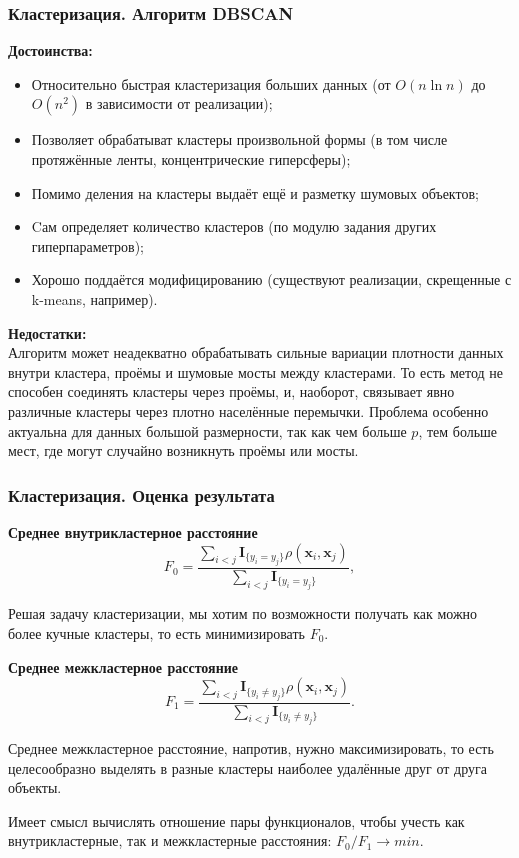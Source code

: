 \documentclass[notheorems, handout]{beamer}
\begin{document}
	\begin{frame}
	\frametitle{Кластеризация. Алгоритм DBSCAN}
	

	\textbf{Достоинства:} 
\begin{itemize}
	\item Относительно быстрая кластеризация больших данных (от $O(n \ln n)$ до $O(n^2)$ в зависимости от реализации); 
	\item Позволяет обрабатыват кластеры произвольной формы (в том числе протяжённые ленты, концентрические гиперсферы); 
	\item Помимо деления на кластеры выдаёт ещё и разметку шумовых объектов; 
	\item Cам определяет количество кластеров (по модулю задания других гиперпараметров);
	\item Хорошо поддаётся модифицированию (существуют реализации, скрещенные с k-means, например). 
\end{itemize}

\textbf{Недостатки:}\\ 
	Алгоритм может неадекватно обрабатывать сильные вариации плотности данных внутри кластера, проёмы и шумовые мосты между кластерами.
	То есть метод не способен соединять кластеры через проёмы, и, наоборот, связывает явно различные кластеры через плотно населённые перемычки. Проблема особенно актуальна для данных большой размерности, так как чем больше $p$, тем больше мест, где могут случайно возникнуть проёмы или мосты.

	\end{frame}
	
	\begin{frame}
	\frametitle{Кластеризация. Оценка результата}
	

	\textbf{Среднее внутрикластерное расстояние} 
$$F_0 = \frac{\sum_{i < j}\mathbf{I}_{\{y_i = y_j\}}\rho(\pmb x_i, \pmb x_j)}{\sum_{i < j}\mathbf{I}_{\{y_i = y_j\}}},$$ 

Решая задачу кластеризации, мы хотим по возможности получать как можно более кучные кластеры, то есть минимизировать $F_0$.

	\textbf{Среднее межкластерное расстояние} 
	$$F_1 = \frac{\sum_{i < j}\mathbf{I}_{\{y_i \neq y_j\}}\rho(\pmb x_i, \pmb x_j)}{\sum_{i < j}\mathbf{I}_{\{y_i \neq y_j\}}}.$$

Среднее межкластерное расстояние, напротив, нужно максимизировать, то есть целесообразно выделять в разные кластеры наиболее удалённые друг от друга объекты.

Имеет смысл вычислять отношение пары функционалов, чтобы учесть как внутрикластерные, так и межкластерные расстояния: $F_0/F_1 \rightarrow min$.

	\end{frame}
	
\end{document}
